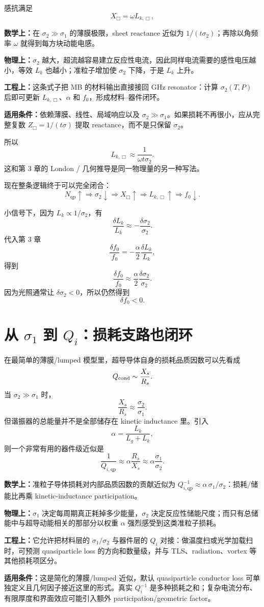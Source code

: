 \documentclass[11pt,a4paper,openany]{ctexrep}
\newcommand{\formulaexplain}[4]{%
\begin{formulaguidebox}
\textbf{\color{KidBlue}数学上：}#1\par
\textbf{\color{KidTeal}物理上：}#2\par
\textbf{\color{KidGold!55!black}工程上：}#3\par
\textbf{\color{KidRed}适用条件：}#4
\end{formulaguidebox}%
}
\newcommand{\qp}{\mathrm{qp}}
\begin{document}
感抗满足
\[
X_{\Box}=\omega L_{k,\Box},
\]
\formulaexplain
{在 $\sigma_2\gg\sigma_1$ 的薄膜极限，sheet reactance 近似为 $1/(t\sigma_2)$；再除以角频率 $\omega$ 就得到每方块动能电感。}
{$\sigma_2$ 越大，超流越容易建立反应性电流，因此同样电流需要的感性电压越小，等效 $L_k$ 也越小；准粒子增加使 $\sigma_2$ 下降，于是 $L_k$ 上升。}
{这条式子把 MB 的材料输出直接接回 GHz resonator：计算 $\sigma_2(T,P)$ 后即可更新 $L_{k,\Box}$、$\alpha$ 和 $f_0$，形成材料--器件闭环。}
{依赖薄膜、线性、局域响应以及 $\sigma_2\gg\sigma_1$。如果损耗不再很小，应从完整复数 $Z_{\Box}=1/(t\sigma)$ 提取 reactance，而不是只保留 $\sigma_2$。}

所以
\[
\boxed{
L_{k,\Box}
\approx
\frac{1}{\omega t\sigma_2}.
}
\]
这和第 3 章的 London / 几何推导是同一物理量的另一种写法。

现在整条逻辑终于可以完全闭合：
\[
N_{\qp}\uparrow
\Rightarrow
\sigma_2\downarrow
\Rightarrow
X_{\Box}\uparrow
\Rightarrow
L_{k,\Box}\uparrow
\Rightarrow
f_0\downarrow.
\]

小信号下，因为 $L_k\propto1/\sigma_2$，有
\[
\frac{\delta L_k}{L_k}
\approx
-\frac{\delta\sigma_2}{\sigma_2}.
\]
代入第 3 章
\[
\frac{\delta f_0}{f_0}
=-\frac{\alpha}{2}\frac{\delta L_k}{L_k},
\]
得到
\[
\boxed{
\frac{\delta f_0}{f_0}
\approx
\frac{\alpha}{2}
\frac{\delta\sigma_2}{\sigma_2}.
}
\]
因为光照通常让 $\delta\sigma_2<0$，所以仍然得到
\[
\boxed{\delta f_0<0.}
\]

\section{从 $\sigma_1$ 到 $Q_i$：损耗支路也闭环}

在最简单的薄膜/lumped 模型里，超导导体自身的损耗品质因数可以先看成
\[
Q_{\rm cond}
\sim
\frac{X_s}{R_s}.
\]
当 $\sigma_2\gg\sigma_1$ 时，
\[
\frac{X_s}{R_s}
\approx
\frac{\sigma_2}{\sigma_1}.
\]
但谐振器的总能量并不是全部储存在 kinetic inductance 里。引入
\[
\alpha=\frac{L_k}{L_g+L_k},
\]
则一个非常有用的器件级近似是
\[
\boxed{
\frac{1}{Q_{i,\qp}}
\approx
\alpha\frac{R_s}{X_s}
\approx
\alpha\frac{\sigma_1}{\sigma_2}.
}
\]
\formulaexplain
{准粒子导体损耗对内部品质因数的贡献近似为 $Q_{i,\qp}^{-1}\approx\alpha\,\sigma_1/\sigma_2$：损耗/储能比再乘 kinetic-inductance participation。}
{$\sigma_1$ 决定每周期真正耗掉多少能量，$\sigma_2$ 决定反应性储能尺度；而只有总储能中与超导动能相关的那部分以权重 $\alpha$ 强烈感受到这类准粒子损耗。}
{它允许把材料层的 $\sigma_1/\sigma_2$ 与器件层的 $Q_i$ 对接：做温度扫或光学加载扫时，可预测 quasiparticle loss 的方向和数量级，并与 TLS、radiation、vortex 等其他损耗项区分。}
{这是简化的薄膜/lumped 近似，默认 quasiparticle conductor loss 可单独定义且几何因子接近这里的形式。真实 $Q_i^{-1}$ 是多种损耗之和；复杂电流分布、有限厚度和界面效应可能引入额外 participation/geometric factor。}
\end{document}
